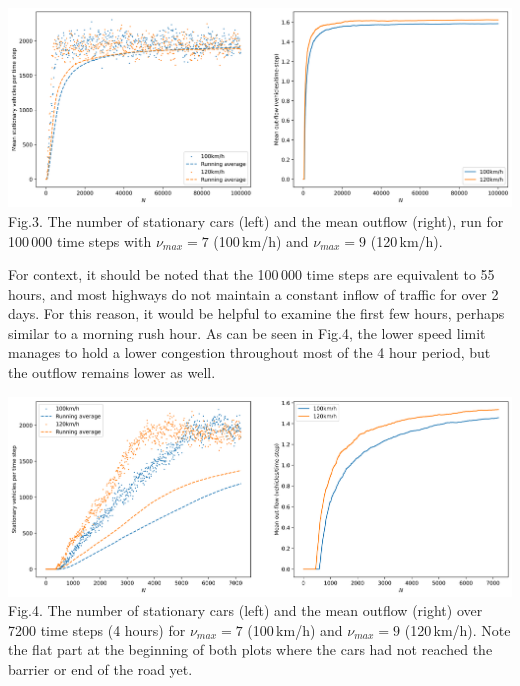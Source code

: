 \documentclass[11pt]{article}
\begin{document}
	\begin{center}
		\includegraphics[scale=0.46]{Figures/Plain_bottleneck.png}\\
		Fig.3.	
		The number of stationary cars (left) and the mean outflow (right), run for 100\,000 time steps with $\nu_{max}=7$ (100\,km/h) and $\nu_{max}=9$ (120\,km/h). \\
	\end{center}

	For context, it should be noted that the 100\,000 time steps are equivalent to 55 hours, and most highways do not maintain a constant inflow of traffic for over 2 days. For this reason, it would be helpful to examine the first few hours, perhaps similar to a morning rush hour. As can be seen in Fig.4, the lower speed limit manages to hold a lower congestion throughout most of the 4 hour period, but the outflow remains lower as well.\\
	
	\begin{center}
		\includegraphics[scale=0.46]{Figures/Plain_bottleneck_4hour.png}\\
		Fig.4.	
		The number of stationary cars (left) and the mean outflow (right) over 7200 time steps (4 hours) for $\nu_{max}=7$ (100\,km/h) and $\nu_{max}=9$ (120\,km/h). Note the flat part at the beginning of both plots where the cars had not reached the barrier or end of the road yet. \\
	\end{center}
\end{document}
